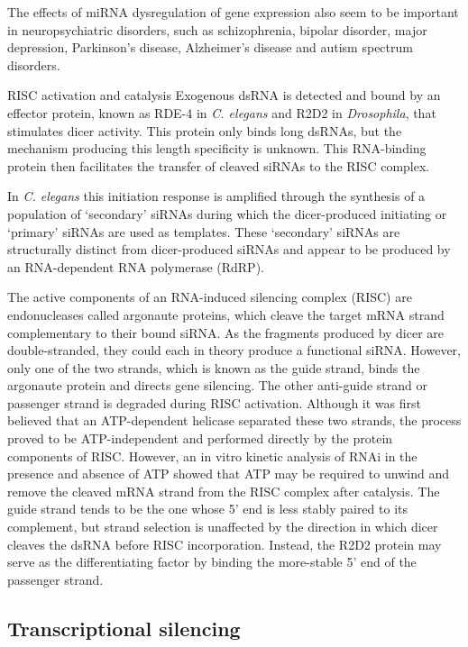 The effects of miRNA dysregulation of gene expression also seem to be important in neuropsychiatric disorders, such as schizophrenia, bipolar disorder, major depression, Parkinson's disease, Alzheimer's disease and autism spectrum disorders.

RISC activation and catalysis
Exogenous dsRNA is detected and bound by an effector protein, known as RDE-4 in \emph{C. elegans} and R2D2 in \emph{Drosophila}, that stimulates dicer activity. This protein only binds long dsRNAs, but the mechanism producing this length specificity is unknown. This RNA-binding protein then facilitates the transfer of cleaved siRNAs to the RISC complex.

In \emph{C. elegans} this initiation response is amplified through the synthesis of a population of `secondary' siRNAs during which the dicer-produced initiating or `primary' siRNAs are used as templates. These `secondary' siRNAs are structurally distinct from dicer-produced siRNAs and appear to be produced by an RNA-dependent RNA polymerase (RdRP).

The active components of an RNA-induced silencing complex (RISC) are endonucleases called argonaute proteins, which cleave the target mRNA strand complementary to their bound siRNA. As the fragments produced by dicer are double-stranded, they could each in theory produce a functional siRNA. However, only one of the two strands, which is known as the guide strand, binds the argonaute protein and directs gene silencing. The other anti-guide strand or passenger strand is degraded during RISC activation. Although it was first believed that an ATP-dependent helicase separated these two strands, the process proved to be ATP-independent and performed directly by the protein components of RISC. However, an in vitro kinetic analysis of RNAi in the presence and absence of ATP showed that ATP may be required to unwind and remove the cleaved mRNA strand from the RISC complex after catalysis. The guide strand tends to be the one whose 5' end is less stably paired to its complement, but strand selection is unaffected by the direction in which dicer cleaves the dsRNA before RISC incorporation. Instead, the R2D2 protein may serve as the differentiating factor by binding the more-stable 5' end of the passenger strand.

\hypertarget{transcriptional-silencing}{%
\subsection{Transcriptional silencing}\label{transcriptional-silencing}}

